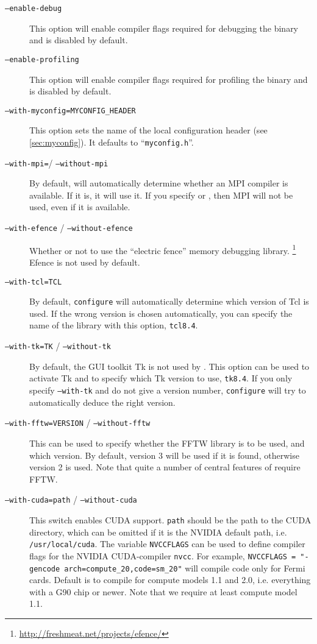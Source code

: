 \begin{description}
\item[\texttt{--enable-debug}] This option will enable compiler flags
  required for debugging the \es binary and is disabled by default.
\item[\texttt{--enable-profiling}] This option will enable compiler
  flags required for profiling the \es binary and is disabled by
  default.
\item[\texttt{--with-myconfig=MYCONFIG\_HEADER}] This option sets the
  name of the local configuration header (see \vref{sec:myconfig}). It
  defaults to ``\texttt{myconfig.h}''.
\item[\texttt{--with-mpi=}/ \texttt{--without-mpi}] By default,
   will automatically determine whether an MPI
  compiler is available.  If it is, it will use it.  If you specify
   or , then MPI will
  not be used, even if it is available.
\item[\texttt{--with-efence} / \texttt{--without-efence}] Whether or
  not to use the ``electric fence'' memory debugging library.
  \footnote{\url{http://freshmeat.net/projects/efence/}} Efence is not
  used by default.
\item[\texttt{--with-tcl=TCL}] By default, \texttt{configure} will
  automatically determine which version of Tcl is used.  If the wrong
  version is chosen automatically, you can specify the name of the
  library with this option, \eg{} \texttt{tcl8.4}.
\item[\texttt{--with-tk=TK} / \texttt{--without-tk}] By default, the
  GUI toolkit Tk is not used by \es. This option can be used to
  activate Tk and to specify which Tk version to use, \eg{}
  \texttt{tk8.4}. If you only specify \texttt{--with-tk} and do not
  give a version number, \texttt{configure} will try to automatically
  deduce the right version.
\item[\texttt{--with-fftw=VERSION} / \texttt{--without-fftw}] This can
  be used to specify whether the FFTW library is to be used, and which
  version.  By default, version 3 will be used if it is found,
  otherwise version 2 is used.  Note that quite a number of central
  features of \es require FFTW.
\item[\texttt{--with-cuda=path} / \texttt{--without-cuda}] This switch
  enables CUDA support. \texttt{path} should be the path to the CUDA
  directory, which can be omitted if it is the NVIDIA default path,
  i.e. \texttt{/usr/local/cuda}. The variable \texttt{NVCCFLAGS} can
  be used to define compiler flags for the NVIDIA CUDA-compiler
  \texttt{nvcc}. For example, \texttt{NVCCFLAGS = "{}-gencode
    arch=compute_20,code=sm_20"{}} will compile code only for Fermi
  cards.  Default is to compile for compute models 1.1 and 2.0,
  i.e. everything with a G90 chip or newer.  Note that we require at
  least compute model 1.1.
\end{description}

